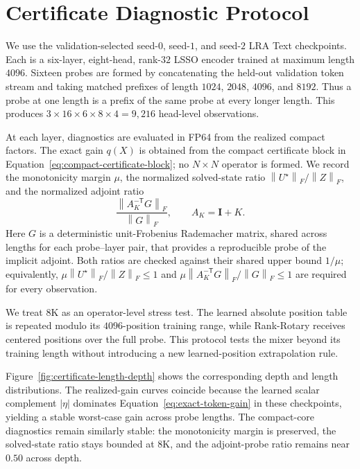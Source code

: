 \documentclass[10pt]{article}
\newcommand{\I}{\mathbf{I}}
\newcommand{\T}{\mathsf{T}}
\newcommand{\norm}[1]{\left\lVert #1 \right\rVert}
\begin{document}
\section{Certificate Diagnostic Protocol}
\label{app:certificate-protocol}

We use the validation-selected seed-$0$, seed-$1$, and seed-$2$ LRA Text
checkpoints.  Each is a six-layer, eight-head, rank-$32$ LSSO encoder trained at
maximum length $4096$.  Sixteen probes are formed by concatenating the held-out
validation token stream and taking matched prefixes of length $1024$, $2048$,
$4096$, and $8192$.  Thus a probe at one length is a prefix of the same probe at
every longer length.  This produces
$3\times16\times6\times8\times4=9{,}216$ head-level observations.

At each layer, diagnostics are evaluated in FP64 from the realized compact
factors.  The exact gain $q(X)$ is obtained from the compact certificate block
in Equation~\eqref{eq:compact-certificate-block}; no $N\times N$ operator is
formed.  We record the monotonicity margin $\mu$, the normalized solved-state
ratio $\norm{U^\star}_F/\norm{Z}_F$, and the normalized adjoint ratio
\begin{equation}
    \frac{\norm{A_K^{-\T}G}_F}{\norm{G}_F},
    \qquad A_K=\I+K.
\end{equation}
Here $G$ is a deterministic unit-Frobenius Rademacher matrix, shared across
lengths for each probe--layer pair, that provides a reproducible probe of the
implicit adjoint.
Both ratios are checked against their shared upper bound $1/\mu$; equivalently,
$\mu\norm{U^\star}_F/\norm{Z}_F\leq1$ and
$\mu\norm{A_K^{-\T}G}_F/\norm{G}_F\leq1$ are required for every observation.

We treat $8$K as an operator-level stress test.  The learned absolute position
table is repeated modulo its $4096$-position training range, while Rank-Rotary
receives centered positions over the full probe.  This protocol tests the
mixer beyond its training length without introducing a new learned-position
extrapolation rule.

Figure~\ref{fig:certificate-length-depth} shows the corresponding depth and
length distributions.  The realized-gain curves coincide because the learned
scalar complement $|\eta|$ dominates Equation~\eqref{eq:exact-token-gain} in
these checkpoints, yielding a stable worst-case gain across probe lengths.  The
compact-core diagnostics remain similarly stable: the monotonicity margin is
preserved, the solved-state ratio stays bounded at $8$K, and the adjoint-probe
ratio remains near $0.50$ across depth.
\end{document}
